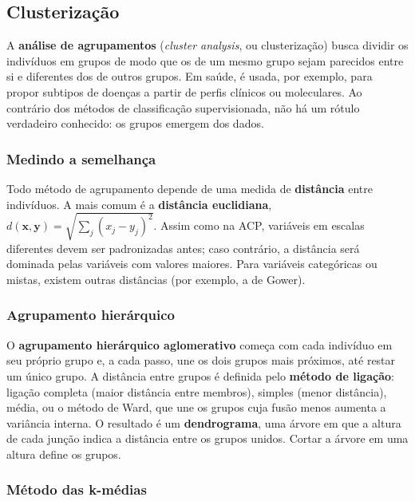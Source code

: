 \documentclass[
]{book}
\begin{document}
\subsection{Clusterização}\label{clusterizauxe7uxe3o}

A \textbf{análise de agrupamentos} (\emph{cluster analysis}, ou clusterização) busca dividir os indivíduos em grupos de modo que os de um mesmo grupo sejam parecidos entre si e diferentes dos de outros grupos. Em saúde, é usada, por exemplo, para propor subtipos de doenças a partir de perfis clínicos ou moleculares. Ao contrário dos métodos de classificação supervisionada, não há um rótulo verdadeiro conhecido: os grupos emergem dos dados.

\subsubsection{Medindo a semelhança}\label{medindo-a-semelhanuxe7a}

Todo método de agrupamento depende de uma medida de \textbf{distância} entre indivíduos. A mais comum é a \textbf{distância euclidiana}, \(d(\mathbf{x}, \mathbf{y}) = \sqrt{\sum_j (x_j - y_j)^2}\). Assim como na ACP, variáveis em escalas diferentes devem ser padronizadas antes; caso contrário, a distância será dominada pelas variáveis com valores maiores. Para variáveis categóricas ou mistas, existem outras distâncias (por exemplo, a de Gower).

\subsubsection{Agrupamento hierárquico}\label{agrupamento-hieruxe1rquico}

O \textbf{agrupamento hierárquico aglomerativo} começa com cada indivíduo em seu próprio grupo e, a cada passo, une os dois grupos mais próximos, até restar um único grupo. A distância entre grupos é definida pelo \textbf{método de ligação}: ligação completa (maior distância entre membros), simples (menor distância), média, ou o método de Ward, que une os grupos cuja fusão menos aumenta a variância interna. O resultado é um \textbf{dendrograma}, uma árvore em que a altura de cada junção indica a distância entre os grupos unidos. Cortar a árvore em uma altura define os grupos.

\subsubsection{Método das k-médias}\label{muxe9todo-das-k-muxe9dias}
\end{document}
